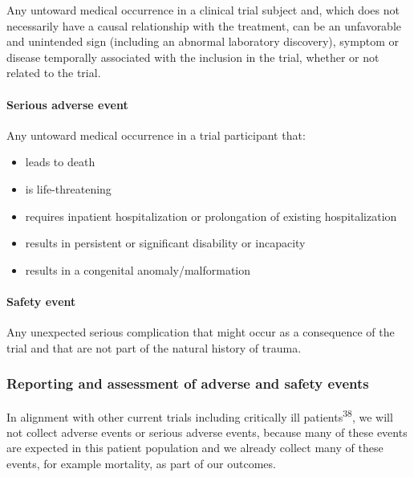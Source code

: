 \documentclass[
]{scrartcl}
\let\oldparagraph\paragraph
\renewcommand{\paragraph}[1]{\oldparagraph{#1}\mbox{}}
\providecommand{\tightlist}{%
  \setlength{\itemsep}{0pt}\setlength{\parskip}{0pt}}\usepackage{longtable,booktabs,array}
\begin{document}
Any untoward medical occurrence in a clinical trial subject and, which
does not necessarily have a causal relationship with the treatment, can
be an unfavorable and unintended sign (including an abnormal laboratory
discovery), symptom or disease temporally associated with the inclusion
in the trial, whether or not related to the trial.

\hypertarget{serious-adverse-event}{%
\paragraph{Serious adverse event}\label{serious-adverse-event}}

Any untoward medical occurrence in a trial participant that:

\begin{itemize}
\tightlist
\item
  leads to death
\item
  is life-threatening
\item
  requires inpatient hospitalization or prolongation of existing
  hospitalization
\item
  results in persistent or significant disability or incapacity
\item
  results in a congenital anomaly/malformation
\end{itemize}

\hypertarget{safety-event}{%
\paragraph{Safety event}\label{safety-event}}

Any unexpected serious complication that might occur as a consequence of
the trial and that are not part of the natural history of trauma.

\hypertarget{reporting-and-assessment-of-adverse-and-safety-events}{%
\subsubsection{Reporting and assessment of adverse and safety
events}\label{reporting-and-assessment-of-adverse-and-safety-events}}

In alignment with other current trials including critically ill
patients\textsuperscript{38}, we will not collect adverse events or
serious adverse events, because many of these events are expected in
this patient population and we already collect many of these events, for
example mortality, as part of our outcomes.
\end{document}
